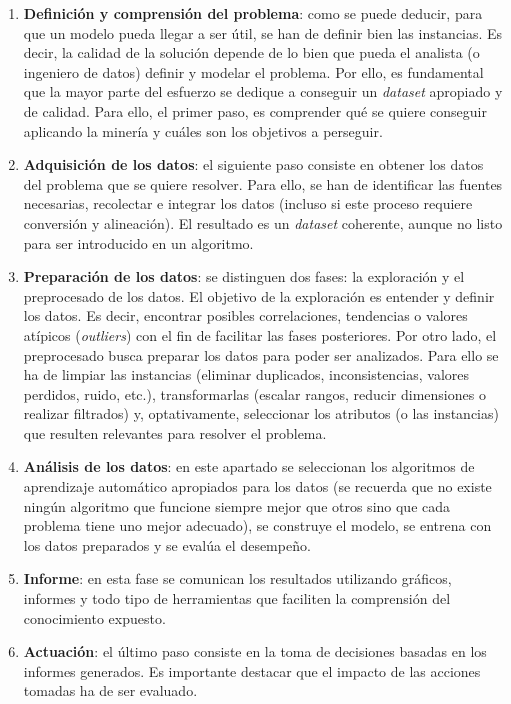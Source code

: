 \begin{enumerate}
	\item \textbf{Definición y comprensión del problema}: como se puede deducir, para que un modelo pueda llegar a ser útil, se han de definir bien las instancias. Es decir, la calidad de la solución depende de lo bien que pueda el analista (o ingeniero de datos) definir y modelar el problema. Por ello, es fundamental que la mayor parte del esfuerzo se dedique a conseguir un \textit{dataset} apropiado y de calidad. Para ello, el primer paso, es comprender qué se quiere conseguir aplicando la minería y cuáles son los objetivos a perseguir.
	
	\item \textbf{Adquisición de los datos}: el siguiente paso consiste en obtener los datos del problema que se quiere resolver. Para ello, se han de identificar las fuentes necesarias, recolectar e integrar los datos (incluso si este proceso requiere conversión y alineación). El resultado es un \textit{dataset} coherente, aunque no listo para ser introducido en un algoritmo.
	
	\item \textbf{Preparación de los datos}: se distinguen dos fases: la exploración y el preprocesado de los datos. El objetivo de la exploración es entender y definir los datos. Es decir, encontrar posibles correlaciones, tendencias o valores atípicos (\textit{outliers}) con el fin de facilitar las fases posteriores. Por otro lado, el preprocesado busca preparar los datos para poder ser analizados. Para ello se ha de limpiar las instancias (eliminar duplicados, inconsistencias, valores perdidos, ruido, etc.), transformarlas (escalar rangos, reducir dimensiones o realizar filtrados) y, optativamente, seleccionar los atributos (o las instancias) que resulten relevantes para resolver el problema.
	
	\item \textbf{Análisis de los datos}: en este apartado se seleccionan los algoritmos de aprendizaje automático apropiados para los datos (se recuerda que no existe ningún algoritmo que funcione siempre mejor que otros sino que cada problema tiene uno mejor adecuado), se construye el modelo, se entrena con los datos preparados y se evalúa el desempeño.
	\item \textbf{Informe}: en esta fase se comunican los resultados utilizando gráficos, informes y todo tipo de herramientas que faciliten la comprensión del conocimiento expuesto.
	\item \textbf{Actuación}: el último paso consiste en la toma de decisiones basadas en los informes generados. Es importante destacar que el impacto de las acciones tomadas ha de ser evaluado.
\end{enumerate}

